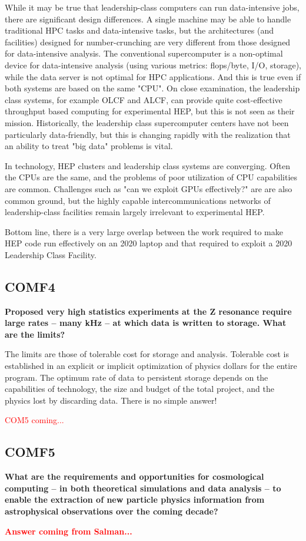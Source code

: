 While it may be true that leadership-class computers can run data-intensive jobs, there are significant design differences.
A single machine may be able to handle traditional HPC tasks and data-intensive tasks, but the architectures (and facilities) designed for number-crunching are very different from those designed for data-intensive analysis. The conventional supercomputer is a non-optimal device for data-intensive analysis (using various metrics: flops/byte, I/O, storage), while the data server is not optimal for HPC applications. And this is true even if both systems are based on the same "CPU". 
 On close examination, the leadership class systems, for example OLCF and
ALCF, can provide quite cost-effective throughput based computing for
experimental HEP, but this is not seen as their mission.  Historically,
the leadership class supercomputer centers have not been particularly
data-friendly, but this is changing rapidly with the realization that an
ability to treat "big data" problems is vital.

In technology, HEP clusters and leadership class systems are converging.
Often the CPUs are the same, and the problems of poor utilization of CPU
capabilities are common. Challenges such as "can we exploit GPUs
effectively?" are are also common ground, but the highly capable
intercommunications networks of leadership-class facilities remain largely
irrelevant to experimental HEP.

Bottom line, there is a very large overlap between the work required to
make HEP code run effectively on an 2020 laptop and that required to
exploit a 2020 Leadership Class Facility.


\subsection{COMF4}

{\bf
 Proposed very high statistics experiments at the Z resonance require large rates --
many kHz -- at which data is written to storage. What are the limits?}


The limits are those of tolerable cost for storage and analysis.
Tolerable cost is established in an explicit or implicit optimization of
physics dollars for the entire program.  The optimum rate of data to persistent
storage depends on the capabilities of technology, the size and budget of
the total project, and the physics lost by discarding data. There is no
simple answer!

\textcolor{red} {COM5 coming...}
\subsection{COMF5}
 
 {\bf
 What are the requirements and opportunities for cosmological computing -- in both
theoretical simulations and data analysis -- to enable the extraction of new particle
physics information from astrophysical observations over the coming decade?}

\textcolor{red}{
{\bf Answer coming from Salman...}}







